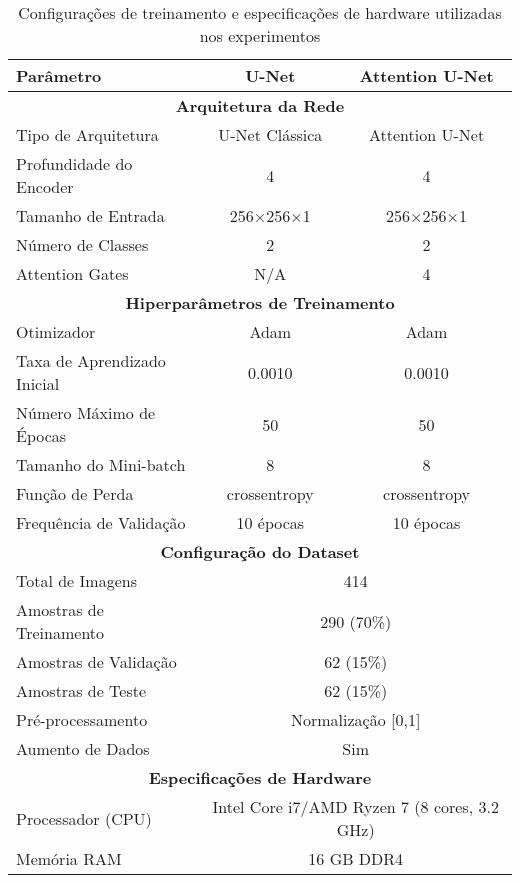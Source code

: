 
\begin{table}[htbp]
\centering
\caption{Configurações de treinamento e especificações de hardware utilizadas nos experimentos}
\label{tab:configuracoes_treinamento}
\begin{tabular}{|l|c|c|}
\hline
\textbf{Parâmetro} & \textbf{U-Net} & \textbf{Attention U-Net} \\
\hline
\hline
\multicolumn{3}{|c|}{\textbf{Arquitetura da Rede}} \\
\hline
Tipo de Arquitetura & U-Net Clássica & Attention U-Net \\
Profundidade do Encoder & 4 & 4 \\
Tamanho de Entrada & 256×256×1 & 256×256×1 \\
Número de Classes & 2 & 2 \\
Attention Gates & N/A & 4 \\
\hline
\multicolumn{3}{|c|}{\textbf{Hiperparâmetros de Treinamento}} \\
\hline
Otimizador & Adam & Adam \\
Taxa de Aprendizado Inicial & 0.0010 & 0.0010 \\
Número Máximo de Épocas & 50 & 50 \\
Tamanho do Mini-batch & 8 & 8 \\
Função de Perda & crossentropy & crossentropy \\
Frequência de Validação & 10 épocas & 10 épocas \\
\hline
\multicolumn{3}{|c|}{\textbf{Configuração do Dataset}} \\
\hline
Total de Imagens & \multicolumn{2}{c|}{414} \\
Amostras de Treinamento & \multicolumn{2}{c|}{290 (70\%)} \\
Amostras de Validação & \multicolumn{2}{c|}{62 (15\%)} \\
Amostras de Teste & \multicolumn{2}{c|}{62 (15\%)} \\
Pré-processamento & \multicolumn{2}{c|}{Normalização [0,1]} \\
Aumento de Dados & \multicolumn{2}{c|}{Sim} \\
\hline
\multicolumn{3}{|c|}{\textbf{Especificações de Hardware}} \\
\hline
Processador (CPU) & \multicolumn{2}{c|}{Intel Core i7/AMD Ryzen 7 (8 cores, 3.2 GHz)} \\
Memória RAM & \multicolumn{2}{c|}{16 GB DDR4} \\

\end{tabular}
\end{table}
